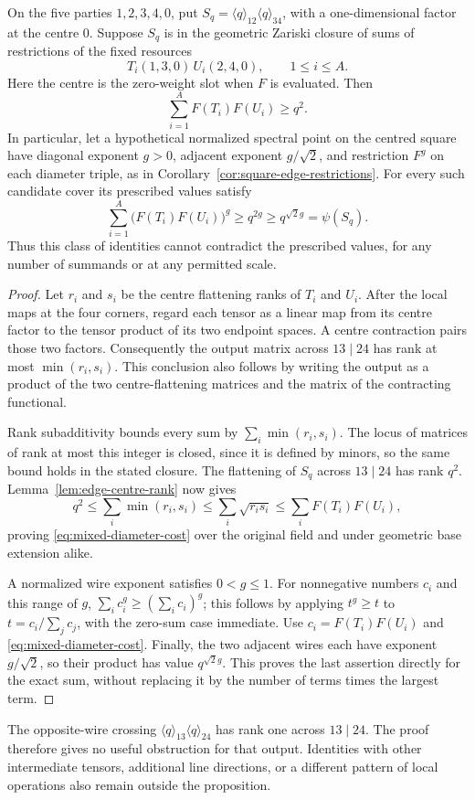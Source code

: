 \begin{proposition}
\label{prop:mixed-diameter-sums}
On the five parties $1,2,3,4,0$, put
$S_q=\langle q\rangle_{12}\langle q\rangle_{34}$, with a
one-dimensional factor at the centre $0$. Suppose $S_q$ is in the
geometric Zariski closure of sums of restrictions of the fixed resources
\[
 T_i(1,3,0)\,U_i(2,4,0),\qquad 1\leq i\leq A.
\]
Here the centre is the zero-weight slot when $F$ is evaluated.
Then
\begin{equation}\label{eq:mixed-diameter-cost}
 \sum_{i=1}^A F(T_i)F(U_i)\geq q^2.
\end{equation}
In particular, let a hypothetical normalized spectral point on the
centred square have diagonal exponent $g>0$, adjacent exponent
$g/\sqrt2$, and restriction $F^g$ on each diameter triple, as in
Corollary~\ref{cor:square-edge-restrictions}. For every such candidate
cover its prescribed values satisfy
\[
 \sum_{i=1}^A\bigl(F(T_i)F(U_i)\bigr)^g
 \geq q^{2g}\geq q^{\sqrt2g}=\psi(S_q).
\]
Thus this class of identities cannot contradict the prescribed values,
for any number of summands or at any permitted scale.
\end{proposition}
\begin{proof}
Let $r_i$ and $s_i$ be the centre flattening ranks of $T_i$ and
$U_i$. After the local maps at the four corners, regard each tensor
as a linear map from its centre factor to the tensor product of its
two endpoint spaces. A centre contraction pairs those two factors.
Consequently the output matrix across $13\mid24$ has rank at most
$\min(r_i,s_i)$. This conclusion also follows by writing the output
as a product of the two centre-flattening matrices and the matrix
of the contracting functional.

Rank subadditivity bounds every sum by
$\sum_i\min(r_i,s_i)$. The locus of matrices of rank at most this
integer is closed, since it is defined by minors, so the same bound
holds in the stated closure. The flattening of $S_q$ across
$13\mid24$ has rank $q^2$. Lemma~\ref{lem:edge-centre-rank} now gives
\[
 q^2\leq\sum_i\min(r_i,s_i)
 \leq\sum_i\sqrt{r_i s_i}
 \leq\sum_iF(T_i)F(U_i),
\]
proving \eqref{eq:mixed-diameter-cost} over the original field and
under geometric base extension alike.

A normalized wire exponent satisfies $0<g\leq1$. For nonnegative
numbers $c_i$ and this range of $g$,
$\sum_i c_i^g\geq(\sum_i c_i)^g$; this follows by applying
$t^g\geq t$ to $t=c_i/\sum_jc_j$, with the zero-sum case immediate.
Use $c_i=F(T_i)F(U_i)$ and \eqref{eq:mixed-diameter-cost}. Finally,
the two adjacent wires each have exponent $g/\sqrt2$, so their
product has value $q^{\sqrt2g}$. This proves the last assertion
directly for the exact sum, without replacing it by the number of
terms times the largest term.
\end{proof}

The opposite-wire crossing
$\langle q\rangle_{13}\langle q\rangle_{24}$ has rank one across
$13\mid24$. The proof therefore gives no useful obstruction for
that output. Identities with other intermediate tensors, additional
line directions, or a different pattern of local operations also
remain outside the proposition.

